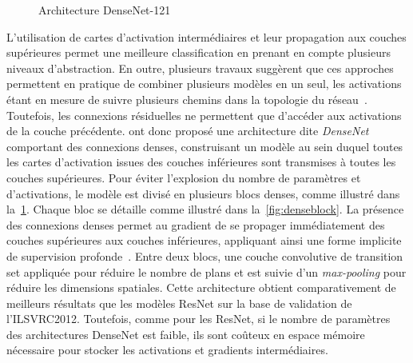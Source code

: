 \begin{figure}[t]
  \resizebox{\textwidth}{!}{
    
  }
  \caption{Architecture DenseNet-121~\cite{huang_densely_2017}}
  \label{fig:densenet}
\end{figure}


L'utilisation de cartes d'activation intermédiaires et leur propagation aux couches supérieures permet une meilleure classification en prenant en compte plusieurs niveaux d'abstraction. En outre, plusieurs travaux suggèrent que ces approches permettent en pratique de combiner plusieurs modèles en un seul, les activations étant en mesure de suivre plusieurs chemins dans la topologie du réseau~\cite{veit_residual_2016,huang_deep_2016}. Toutefois, les connexions résiduelles ne permettent que d'accéder aux activations de la couche précédente. \citet{huang_densely_2017} ont donc proposé une architecture dite \emph{DenseNet} comportant des connexions denses, construisant un modèle au sein duquel toutes les cartes d'activation issues des couches inférieures sont transmises à toutes les couches supérieures. Pour éviter l'explosion du nombre de paramètres et d'activations, le modèle est divisé en plusieurs blocs denses, comme illustré dans la~\cref{fig:densenet}. Chaque bloc se détaille comme illustré dans la~\cref{fig:denseblock}. La présence des connexions denses permet au gradient de se propager immédiatement des couches supérieures aux couches inférieures, appliquant ainsi une forme implicite de supervision profonde~\cite{lee_deeply-supervised_2015}. Entre deux blocs, une couche convolutive de transition set appliquée pour réduire le nombre de plans et est suivie d'un \emph{max-pooling} pour réduire les dimensions spatiales. Cette architecture obtient comparativement de meilleurs résultats que les modèles ResNet sur la base de validation de l'\gls{ILSVRC}2012. Toutefois, comme pour les ResNet, si le nombre de paramètres des architectures DenseNet est faible, ils sont coûteux en espace mémoire nécessaire pour stocker les activations et gradients intermédiaires.

